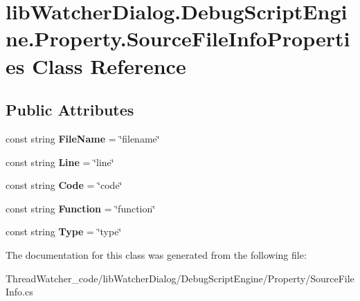 \hypertarget{classlib_watcher_dialog_1_1_debug_script_engine_1_1_property_1_1_source_file_info_properties}{\section{lib\+Watcher\+Dialog.\+Debug\+Script\+Engine.\+Property.\+Source\+File\+Info\+Properties Class Reference}
\label{classlib_watcher_dialog_1_1_debug_script_engine_1_1_property_1_1_source_file_info_properties}
}
\subsection*{Public Attributes}
\begin{DoxyCompactItemize}
\item 
\hypertarget{classlib_watcher_dialog_1_1_debug_script_engine_1_1_property_1_1_source_file_info_properties_a70f8dd21494e606f372be9902c72373d}{const string {\bfseries File\+Name} = \char`\"{}filename\char`\"{}}\label{classlib_watcher_dialog_1_1_debug_script_engine_1_1_property_1_1_source_file_info_properties_a70f8dd21494e606f372be9902c72373d}

\item 
\hypertarget{classlib_watcher_dialog_1_1_debug_script_engine_1_1_property_1_1_source_file_info_properties_a878fd3254df6952c7663ca4ae3723537}{const string {\bfseries Line} = \char`\"{}line\char`\"{}}\label{classlib_watcher_dialog_1_1_debug_script_engine_1_1_property_1_1_source_file_info_properties_a878fd3254df6952c7663ca4ae3723537}

\item 
\hypertarget{classlib_watcher_dialog_1_1_debug_script_engine_1_1_property_1_1_source_file_info_properties_a174709b2908702c27e35680ff7d53c07}{const string {\bfseries Code} = \char`\"{}code\char`\"{}}\label{classlib_watcher_dialog_1_1_debug_script_engine_1_1_property_1_1_source_file_info_properties_a174709b2908702c27e35680ff7d53c07}

\item 
\hypertarget{classlib_watcher_dialog_1_1_debug_script_engine_1_1_property_1_1_source_file_info_properties_a16d1cc1a8b79173c607dcc411f3f3160}{const string {\bfseries Function} = \char`\"{}function\char`\"{}}\label{classlib_watcher_dialog_1_1_debug_script_engine_1_1_property_1_1_source_file_info_properties_a16d1cc1a8b79173c607dcc411f3f3160}

\item 
\hypertarget{classlib_watcher_dialog_1_1_debug_script_engine_1_1_property_1_1_source_file_info_properties_a56b130243b38e411bba8d95f3272f28a}{const string {\bfseries Type} = \char`\"{}type\char`\"{}}\label{classlib_watcher_dialog_1_1_debug_script_engine_1_1_property_1_1_source_file_info_properties_a56b130243b38e411bba8d95f3272f28a}

\end{DoxyCompactItemize}


The documentation for this class was generated from the following file\+:\begin{DoxyCompactItemize}
\item 
Thread\+Watcher\+\_\+code/lib\+Watcher\+Dialog/\+Debug\+Script\+Engine/\+Property/Source\+File\+Info.\+cs\end{DoxyCompactItemize}
